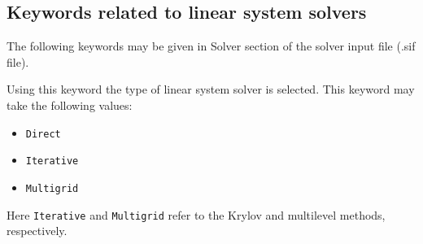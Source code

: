 \begin{versiona}
%





\section{Keywords related to linear system solvers}

\end{versiona}

The following keywords may be given in Solver section of the solver input file (.sif file).

\sifbegin
{}
Using this keyword the type of linear system solver is selected. This keyword may take  
the following values:
\begin{itemize}
\item {\tt Direct}
\item {\tt Iterative}
\item {\tt Multigrid}
\end{itemize}
Here {\tt Iterative} and {\tt Multigrid} refer to the Krylov and multilevel methods,
respectively.   

